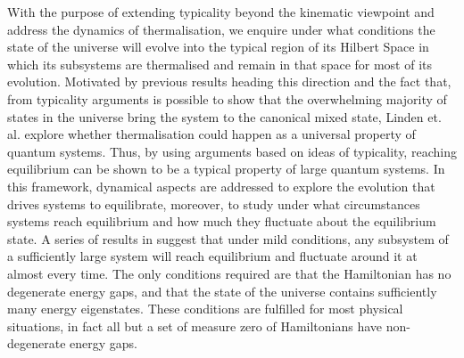 \indent With the purpose of extending typicality beyond the kinematic viewpoint and address the dynamics of thermalisation, we enquire under what conditions the state of the universe will evolve into the typical region of its Hilbert Space in which its subsystems are thermalised and remain in that space for most of its evolution. Motivated by previous results heading this direction\cite{tasaki_quantum_1998,gemmer_thermalization_2006} and the fact that, from typicality arguments is possible to show that the overwhelming majority of states in the universe bring the system to the canonical mixed state, Linden et. al.\cite{linden_quantum_2009} explore whether thermalisation could happen as a universal property of quantum systems. Thus, by using arguments based on ideas of typicality, reaching equilibrium can be shown to be a typical property of large quantum systems. In this framework, dynamical aspects are addressed to explore the evolution that drives systems to equilibrate, moreover, to study under what circumstances systems reach equilibrium and how much they fluctuate about the equilibrium state. A series of results in \cite{linden_quantum_2009, linden_speed_2010, malabarba_quantum_2014} suggest that under mild conditions, any subsystem of a sufficiently large system will reach equilibrium and fluctuate around it at almost every time. The only conditions required are that the Hamiltonian has no degenerate energy gaps, and that the state of the universe contains sufficiently many energy eigenstates. These conditions are fulfilled for most physical situations, in fact all but a set of measure zero of Hamiltonians have non-degenerate energy gaps\cite{linden_quantum_2009}.\\
